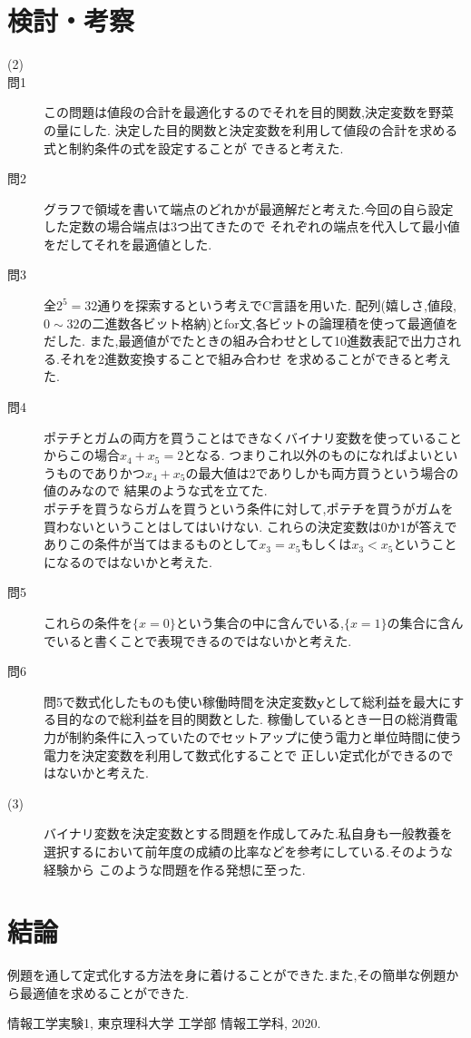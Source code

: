 \documentclass[12pt]{jarticle}
\begin{document}
\section{検討・考察}
\begin{description}
	\item[(2)]
	\item[問1] この問題は値段の合計を最適化するのでそれを目的関数,決定変数を野菜の量にした.
	      決定した目的関数と決定変数を利用して値段の合計を求める式と制約条件の式を設定することが
	      できると考えた.
	\item[問2]
	      グラフで領域を書いて端点のどれかが最適解だと考えた.今回の自ら設定した定数の場合端点は3つ出てきたので
	      それぞれの端点を代入して最小値をだしてそれを最適値とした. 
	\item[問3]
	      全$2^5=32$通りを探索するという考えでC言語を用いた.
	      配列(嬉しさ,値段,$0\sim 32$の二進数各ビット格納)とfor文,各ビットの論理積を使って最適値をだした.
	      また,最適値がでたときの組み合わせとして10進数表記で出力される.それを2進数変換することで組み合わせ
	      を求めることができると考えた. 
	\item[問4]
	      ポテチとガムの両方を買うことはできなくバイナリ変数を使っていることからこの場合$x_4+x_5=2$となる.
	      つまりこれ以外のものになればよいというものでありかつ$x_4+x_5$の最大値は2でありしかも両方買うという場合の値のみなので
	      結果のような式を立てた.\\
	      ポテチを買うならガムを買うという条件に対して,ポテチを買うがガムを買わないということはしてはいけない.
	      これらの決定変数は0か1が答えでありこの条件が当てはまるものとして$x_3=x_5$もしくは$x_3<x_5$ということになるのではないかと考えた.   
	\item[問5]
	      これらの条件を$\{x=0\}$という集合の中に含んでいる,$\{x=1\}$の集合に含んでいると書くことで表現できるのではないかと考えた.   
	\item[問6]
	      問5で数式化したものも使い稼働時間を決定変数$\boldsymbol{y}$として総利益を最大にする目的なので総利益を目的関数とした.
	      稼働しているとき一日の総消費電力が制約条件に入っていたのでセットアップに使う電力と単位時間に使う電力を決定変数を利用して数式化することで
	      正しい定式化ができるのではないかと考えた. 
	\item[(3)]
	      バイナリ変数を決定変数とする問題を作成してみた.私自身も一般教養を選択するにおいて前年度の成績の比率などを参考にしている.そのような経験から
	      このような問題を作る発想に至った.  
\end{description}
\section{結論}
例題を通して定式化する方法を身に着けることができた.また,その簡単な例題から最適値を求めることができた.
\begin{thebibliography}{99}
	\label{sannkoubunnkenn_chapter}
	情報工学実験1,
	東京理科大学 工学部 情報工学科, 2020. 
\end{thebibliography}
\clearpage
\appendix
\end{document}
